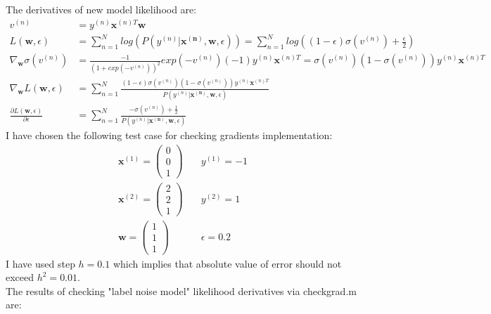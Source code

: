 \documentclass{article}
\newcommand{\vect}[1]{\boldsymbol{#1}} %
\begin{document}
\begin{enumerate}[label=(\alph*)]
						The derivatives of new model likelihood are:
						\begin{align}
							v^{(n)} &= y^{(n)}\vect{x}^{(n)T}\vect{w}
							\\
							L(\vect{w}, \epsilon) &= \sum_{n=1}^{N}log(P(y^{(n)}|\vect{x^{(n)}}, \vect{w}, \epsilon)) = 
							\sum_{n=1}^{N}log((1-\epsilon)\sigma(v^{(n)}) + \frac{\epsilon}{2}) 
							\\
							\nabla_{\vect{w}}\sigma(v^{(n)}) &= 
							\frac{-1} {(1 + exp(-v^{(n)}))^2} exp(-v^{(n)}) (-1) y^{(n)} \vect{x}^{(n)T} 
							= \sigma(v^{(n)}) (1 - \sigma(v^{(n)})) y^{(n)}\vect{x}^{(n)T}
							\\
							\nabla_{\vect{w}}L(\vect{w}, \epsilon) &= 
							\sum_{n=1}^{N}
								\frac
									{ (1 - \epsilon) \sigma(v^{(n)}) (1 - \sigma(v^{(n)}))  y^{(n)} \vect{x}^{(n)T} } 
									{ P(y^{(n)}|\vect{x^{(n)}}, \vect{w}, \epsilon) }				
							\\
							\frac{\partial L(\vect{w}, \epsilon)}{\partial \epsilon} &=
							 \sum_{n=1}^{N} 
								 \frac 
									 {-\sigma(v^{(n)}) + \frac{1}{2}} 
									 {P(y^{(n)}|\vect{x^{(n)}}, \vect{w}, \epsilon)}		
						\end{align}
						I have chosen the following test case for checking gradients implementation:
						\begin{align*}
							\vect{x}^{(1)} = \left(\begin{matrix} 0\\ 0\\ 1 \end{matrix}\right)
							&\quad
							y^{(1)} = -1
							\\
							\vect{x}^{(2)} = \left(\begin{matrix} 2\\ 2\\ 1 \end{matrix}\right)
							&\quad
							y^{(2)}=1 
							\\
							\vect{w} = \left(\begin{matrix} 1\\ 1\\ 1 \end{matrix}\right)
							&\quad
							\epsilon = 0.2
						\end{align*}
						I have used step $h =0.1$ which implies that absolute value of error should not exceed $h^2=0.01$.\\ 
						The results of checking "label noise model" likelihood derivatives via checkgrad.m are:
						\begin{center}

\end{center}
\end{enumerate}
\end{document}
